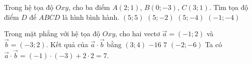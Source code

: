 \begin{ex}%
	Trong hệ tọa độ $Oxy$, cho ba điểm $A(2;1)$, $B(0;-3)$, $C(3;1)$. Tìm tọa độ điểm $D$ để $ABCD$ là hình bình hành.
	\choice
	{\True $(5;5)$}
	{$(5;-2)$}
	{$(5;-4)$}
	{$(-1;-4)$}
\end{ex}

\begin{ex}%
	Trong mặt phẳng với hệ tọa độ $Oxy$, cho hai vectơ $\overrightarrow{a}=(-1; 2)$ và $\overrightarrow{b}=(-3; 2)$. Kết quả của $\overrightarrow{a} \cdot \overrightarrow{b}$ bằng
	\choice
	{$(3; 4)$}
	{$-16$}
	{\True $7$}
	{$(-2;-6)$}
	\loigiai
	{
		Ta có $\overrightarrow{a} \cdot \overrightarrow{b}=(-1)\cdot (-3)+2\cdot 2=7$.
	}
\end{ex}

